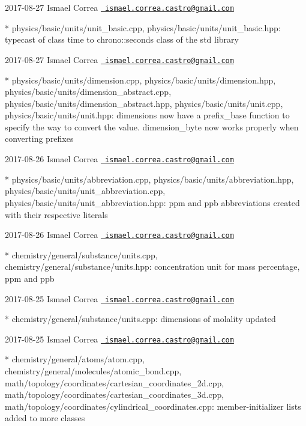  2017-\/08-\/27 Ismael Correa \href{mailto:ismael.correa.castro@gmail.com}{\texttt{ ismael.\+correa.\+castro@gmail.\+com}} \begin{DoxyVerb}* physics/basic/units/unit_basic.cpp,
physics/basic/units/unit_basic.hpp: typecast of class time to
chrono::seconds class of the std library
\end{DoxyVerb}
 2017-\/08-\/27 Ismael Correa \href{mailto:ismael.correa.castro@gmail.com}{\texttt{ ismael.\+correa.\+castro@gmail.\+com}} \begin{DoxyVerb}* physics/basic/units/dimension.cpp,
physics/basic/units/dimension.hpp,
physics/basic/units/dimension_abstract.cpp,
physics/basic/units/dimension_abstract.hpp,
physics/basic/units/unit.cpp, physics/basic/units/unit.hpp: 
dimensions now have a prefix_base function to specify the way to
convert the value. dimension_byte now works properly when converting
prefixes
\end{DoxyVerb}
 2017-\/08-\/26 Ismael Correa \href{mailto:ismael.correa.castro@gmail.com}{\texttt{ ismael.\+correa.\+castro@gmail.\+com}} \begin{DoxyVerb}* physics/basic/units/abbreviation.cpp,
physics/basic/units/abbreviation.hpp,
physics/basic/units/unit_abbreviation.cpp,
physics/basic/units/unit_abbreviation.hpp: ppm and ppb abbreviations
created with their respective literals
\end{DoxyVerb}
 2017-\/08-\/26 Ismael Correa \href{mailto:ismael.correa.castro@gmail.com}{\texttt{ ismael.\+correa.\+castro@gmail.\+com}} \begin{DoxyVerb}* chemistry/general/substance/units.cpp,
chemistry/general/substance/units.hpp: concentration unit for mass
percentage, ppm and ppb
\end{DoxyVerb}
 2017-\/08-\/25 Ismael Correa \href{mailto:ismael.correa.castro@gmail.com}{\texttt{ ismael.\+correa.\+castro@gmail.\+com}} \begin{DoxyVerb}* chemistry/general/substance/units.cpp: dimensions of molality
updated
\end{DoxyVerb}
 2017-\/08-\/25 Ismael Correa \href{mailto:ismael.correa.castro@gmail.com}{\texttt{ ismael.\+correa.\+castro@gmail.\+com}} \begin{DoxyVerb}* chemistry/general/atoms/atom.cpp,
chemistry/general/molecules/atomic_bond.cpp,
math/topology/coordinates/cartesian_coordinates_2d.cpp,
math/topology/coordinates/cartesian_coordinates_3d.cpp,
math/topology/coordinates/cylindrical_coordinates.cpp: 
member-initializer lists added to more classes
\end{DoxyVerb}
